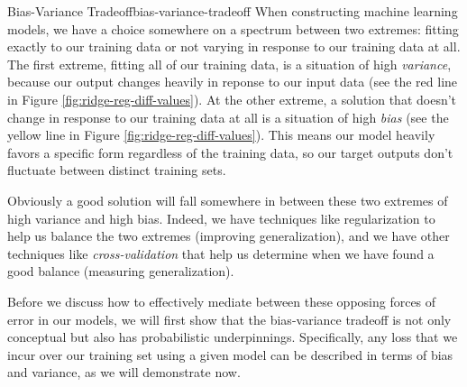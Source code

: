 \begin{definition}{Bias-Variance Tradeoff}{bias-variance-tradeoff}
    When constructing machine learning models, we have a choice somewhere on a spectrum between two extremes: fitting exactly to our training data or not varying in response to our training data at all. The first extreme, fitting all of our training data, is a situation of high \textit{variance}, because our output changes heavily in reponse to our input data (see the red line in Figure \ref{fig:ridge-reg-diff-values}). At the other extreme, a solution that doesn't change in response to our training data at all is a situation of high \textit{bias} (see the yellow line in Figure \ref{fig:ridge-reg-diff-values}). This means our model heavily favors a specific form regardless of the training data, so our target outputs don't fluctuate between distinct training sets.
\end{definition}

Obviously a good solution will fall somewhere in between these two extremes of high variance and high bias. Indeed, we have techniques like regularization to help us balance the two extremes (improving generalization), and we have other techniques like \textit{cross-validation} that help us determine when we have found a good balance (measuring generalization).


Before we discuss how to effectively mediate between these opposing forces of error in our models, we will first show that the bias-variance tradeoff is not only conceptual but also has probabilistic underpinnings. Specifically, any loss that we incur over our training set using a given model can be described in terms of bias and variance, as we will demonstrate now.

